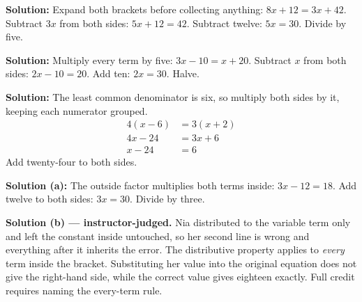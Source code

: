 \documentclass[12pt]{article}
\begin{document}

\textbf{Solution:} \quad Expand both brackets before collecting anything:
$8x + 12 = 3x + 42$. Subtract $3x$ from both sides: $5x + 12 = 42$. Subtract twelve:
$5x = 30$. Divide by five. 


\textbf{Solution:} \quad Multiply every term by five: $3x - 10 = x + 20$. Subtract $x$ from
both sides: $2x - 10 = 20$. Add ten: $2x = 30$. Halve. 


\textbf{Solution:} \quad The least common denominator is six, so multiply both sides by it,
keeping each numerator grouped.
\begin{align*}
  4(x - 6) &= 3(x + 2) \\
  4x - 24 &= 3x + 6 \\
  x - 24 &= 6
\end{align*}
Add twenty-four to both sides. 


\textbf{Solution (a):} \quad The outside factor multiplies both terms inside:
$3x - 12 = 18$. Add twelve to both sides: $3x = 30$. Divide by three. 

\textbf{Solution (b) --- instructor-judged.} \quad Nia distributed to the variable term
only and left the constant inside untouched, so her second line is wrong and everything
after it inherits the error. The distributive property applies to \emph{every} term inside
the bracket. Substituting her value into the original equation does not give the right-hand
side, while the correct value gives eighteen exactly. Full credit requires naming the
every-term rule.
\end{document}
